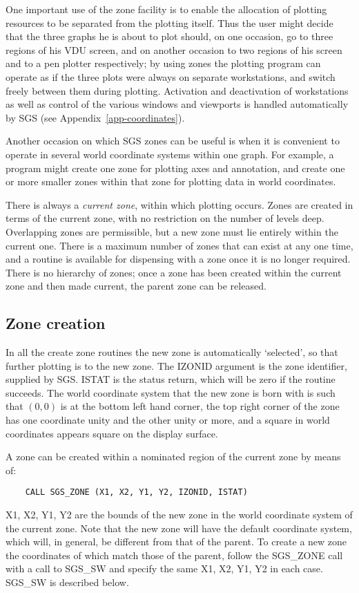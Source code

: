 One important use of the zone
facility is to enable the allocation of plotting
resources to be separated from the plotting itself.  Thus
the user might decide that the three graphs he is about
to plot should, on one occasion, go to three regions of
his VDU screen, and on another occasion to two regions
of his screen and to a pen plotter respectively;  by using
zones the plotting program can operate as if the three
plots were always on separate workstations, and switch freely
between them during plotting.  Activation and deactivation
of workstations as well as
control of the various windows and viewports is handled automatically 
by SGS (see Appendix~\ref{app-coordinates}).

Another occasion on which SGS zones can be useful is when
it is convenient to operate in
several world coordinate systems within one graph.  For
example, a program might create one zone
for plotting axes and annotation, and create one or more smaller
zones within that zone for plotting data in world
coordinates.

There is always a {\em current zone}, within which plotting
occurs.  Zones are created in terms of the current
zone, with no restriction on the number of levels deep.  Overlapping
zones are permissible, but a new zone
must lie entirely within the
current one.  There is a maximum number of
zones that can exist at any one time, and a routine is available for
dispensing with a zone once it is no longer required.  There
is no hierarchy of zones;  once a zone has been created within
the current zone and then made current, the
parent zone can be
released.

\subsection {Zone creation}

In all the create zone routines the new zone is automatically `selected',
so that further plotting is to the new zone.  The IZONID
argument is the zone identifier, supplied by SGS.  ISTAT
is the status return, which will be zero if the routine succeeds.  The
world coordinate system that the new zone is born with is such
that $(0,0)$ is at the bottom left hand corner,
the top right
corner of the zone has one
coordinate unity and the other unity or more,
and a
square in world coordinates appears square
on the display surface.

A zone can be created within a nominated region of the current
zone by means of:
\begin{verbatim}
    CALL SGS_ZONE (X1, X2, Y1, Y2, IZONID, ISTAT)
\end{verbatim}
X1, X2, Y1, Y2 are the bounds of the new zone in the world coordinate
system of the current zone.  Note that the new zone will have
the default coordinate system, which will, in general, be
different from that of the parent.  To create a new zone the
coordinates of which match those of the parent, follow the
SGS\_ZONE call with a call to SGS\_SW and specify the same
X1, X2, Y1, Y2 in each case.  SGS\_SW is described below.

